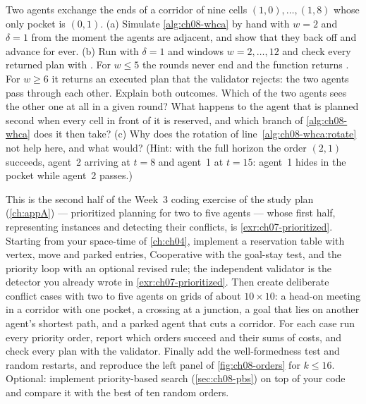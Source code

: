 \begin{exercise}
\label{exr:ch08-whca}
Two agents exchange the ends of a corridor of nine cells $(1,0), \dots, (1,8)$ whose
only pocket is $(0,1)$. (a) Simulate \cref{alg:ch08-whca} by hand with $w = 2$ and
$\delta = 1$ from the moment the agents are adjacent, and show that they back off and
advance for ever. (b) Run  with $\delta = 1$ and
windows $w = 2, \dots, 12$ and check every returned plan with . For
$w \le 5$ the rounds never end and the function returns . For $w \ge 6$ it
returns an executed plan that the validator rejects: the two agents pass through each
other. Explain both outcomes. Which of the two agents sees the other one at all in a
given round? What happens to the agent that is planned second when every cell in front
of it is reserved, and which branch of \cref{alg:ch08-whca} does it then take?
(c) Why does the
rotation of line~\ref{alg:ch08-whca:rotate} not help here, and what would? (Hint: with
the full horizon the order $(2,1)$ succeeds, agent~2 arriving at $t = 8$ and agent~1
at $t = 15$: agent~1 hides in the pocket while agent~2 passes.)
\end{exercise}

\begin{exercise}
\label{exr:ch08-coding}
This is the second half of the Week~3 coding exercise of the study plan
(\cref{ch:appA}) --- prioritized planning for two to five agents --- whose first half,
representing instances and detecting their conflicts, is \cref{exr:ch07-prioritized}.
Starting from your
space-time \astar of \cref{ch:ch04}, implement a reservation table with vertex, move
and parked entries, Cooperative \astar with the goal-stay test, and the priority loop with
an optional revised rule; the independent validator is the detector you already wrote in
\cref{exr:ch07-prioritized}. Then create deliberate conflict
cases with two to five agents on grids of about $10 \times 10$: a head-on meeting in a
corridor with one pocket, a crossing at a junction, a goal that lies on another agent's
shortest path, and a parked agent that cuts a corridor. For each case run every
priority order, report which orders succeed and their sums of costs, and check every
plan with the validator. Finally add the well-formedness test and random restarts, and
reproduce the left panel of \cref{fig:ch08-orders} for $k \le 16$. Optional: implement
priority-based search (\cref{sec:ch08-pbs}) on top of your code and compare it with the
best of ten random orders.
\end{exercise}
